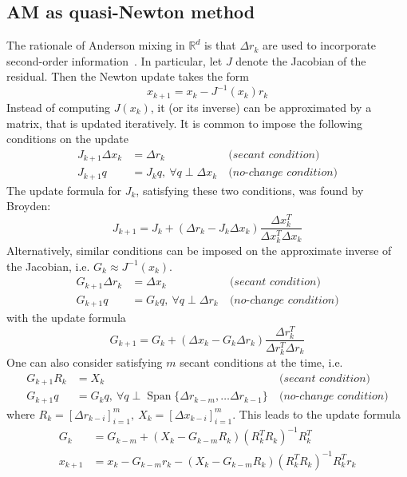 \documentclass{article} %
\numberwithin{equation}{subsection}
\numberwithin{theorem}{section}
\begin{document}
        \subsection{AM as quasi-Newton method}
            The rationale of Anderson mixing in $\mathbb{R}^d$ is that $\Delta r_k$ are used to incorporate second-order information~\cite{fang2009two}.
    In particular, let $J$ denote the Jacobian of the residual.
    Then the Newton update takes the form
    \[
        x_{k+1} = x_k - J^{-1}(x_k)r_k
    \]
    Instead of computing $J(x_k)$, it (or its inverse) can be approximated by a matrix, that is updated iteratively.
    It is common to impose the following conditions on the update
    \begin{align*}
        J_{k+1} \Delta x_k &= \Delta r_k\ &\textit{(secant condition)} \\
        J_{k+1} q &= J_k q,\ \forall q \perp \Delta x_k\ &\textit{(no-change condition)}
    \end{align*}
    The update formula for $J_k$, satisfying these two conditions, was found by Broyden:
    \begin{equation*}\label{eq:broyden_good_update}
        J_{k+1} = J_k + (\Delta r_k - J_k\Delta x_k) \frac{\Delta x_k^T}{\Delta x_k^T \Delta x_k}
    \end{equation*}
    Alternatively, similar conditions can be imposed on the approximate inverse of the Jacobian, i.e. $G_k \approx J^{-1}(x_k)$.
    \begin{align*}
        G_{k+1} \Delta r_k &= \Delta x_k\ &\textit{(secant condition)} \\
        G_{k+1} q &= G_k q,\ \forall q \perp \Delta r_k\ &\textit{(no-change condition)}
    \end{align*}
    with the update formula
    \[
        G_{k+1} = G_k + (\Delta x_k - G_k\Delta r_k) \frac{\Delta r_k^T}{\Delta r_k^T \Delta r_k}
    \]
    One can also consider satisfying $m$ secant conditions at the time, i.e.
    \begin{align*}
        G_{k+1} R_k &= X_k\ &\textit{(secant condition)} \\
        G_{k+1} q &= G_k q,\ \forall q \perp \operatorname{Span}\{ \Delta r_{k - m}, \dots \Delta r_{k-1}\}\ &\textit{(no-change condition)}
    \end{align*}
    where $R_k = [\Delta r_{k-i} ]_{i=1}^{m},\ X_k = [\Delta x_{k-i} ]_{i=1}^{m}$.
    This leads to the update formula
    \begin{align}
        G_k &= G_{k - m} + (X_k - G_{k-m}R_k)(R^T_k R_k)^{-1}R^T_k \label{eq:qN_Jacinv_update} \\
        x_{k+1} &= x_k - G_{k-m}r_k - (X_k -G_{k - m}R_k)(R^T_k R_k)^{-1}R^T_k r_k \label{eq:qN_param_update}
    \end{align}
\end{document}

